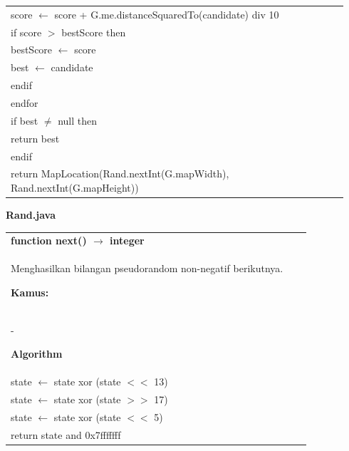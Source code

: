 \documentclass{article}
\newenvironment{pseudobox}
{
\centering
\begin{longtable}{|p{0.94\linewidth}|}
\hline
}
{
\\ \hline
\end{longtable}
\vspace{0.05cm}
}
\begin{document}
\begin{pseudobox}
\hspace*{2em} score $\leftarrow$ score + G.me.distanceSquaredTo(candidate) div 10 \\

\hspace*{2em} if score $>$ bestScore then \\
\hspace*{3em} bestScore $\leftarrow$ score \\
\hspace*{3em} best $\leftarrow$ candidate \\
\hspace*{2em} endif \\
\hspace*{1em} endfor \\

\hspace*{1em} if best $\neq$ null then \\
\hspace*{2em} return best \\
\hspace*{1em} endif \\

\hspace*{1em} return MapLocation(Rand.nextInt(G.mapWidth), Rand.nextInt(G.mapHeight))
\end{pseudobox}



\item \textbf{Rand.java}

\begin{pseudobox}
\textbf{function next() $\rightarrow$ integer} \\
{ Menghasilkan bilangan pseudorandom non-negatif berikutnya. }

\textbf{Kamus:} \\
\hspace*{1em} -

\textbf{Algorithm} \\
\hspace*{1em} state $\leftarrow$ state xor (state $<<$ 13) \\
\hspace*{1em} state $\leftarrow$ state xor (state $>>$ 17) \\
\hspace*{1em} state $\leftarrow$ state xor (state $<<$ 5) \\
\hspace*{1em} return state and 0x7fffffff
\end{pseudobox}
\end{document}
